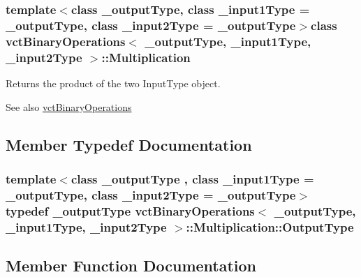 \subsubsection*{template$<$class \+\_\+output\+Type, class \+\_\+input1\+Type = \+\_\+output\+Type, class \+\_\+input2\+Type = \+\_\+output\+Type$>$class vct\+Binary\+Operations$<$ \+\_\+output\+Type, \+\_\+input1\+Type, \+\_\+input2\+Type $>$\+::\+Multiplication}

Returns the product of the two Input\+Type object. 

\begin{DoxySeeAlso}{See also}
\hyperlink{classvct_binary_operations}{vct\+Binary\+Operations} 
\end{DoxySeeAlso}


\subsection{Member Typedef Documentation}
\hypertarget{classvct_binary_operations_1_1_multiplication_a54b8e0ebb628e865d7d5221b2b8dc898}{}
\subsubsection[{Output\+Type}]{\setlength{\rightskip}{0pt plus 5cm}template$<$class \+\_\+output\+Type , class \+\_\+input1\+Type  = \+\_\+output\+Type, class \+\_\+input2\+Type  = \+\_\+output\+Type$>$ typedef \+\_\+output\+Type {\bf vct\+Binary\+Operations}$<$ \+\_\+output\+Type, \+\_\+input1\+Type, \+\_\+input2\+Type $>$\+::{\bf Multiplication\+::\+Output\+Type}}\label{classvct_binary_operations_1_1_multiplication_a54b8e0ebb628e865d7d5221b2b8dc898}


\subsection{Member Function Documentation}
\hypertarget{classvct_binary_operations_1_1_multiplication_abcfcc667a31972270bd3fcbc7b08046e}{}
